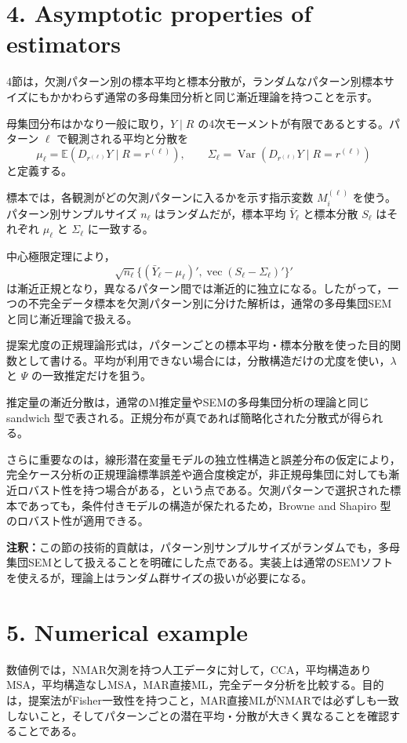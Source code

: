 \documentclass[dvipdfmx,autodetect-engine]{jsarticle}
\newcommand{\E}{\mathbb{E}}
\newcommand{\Var}{\operatorname{Var}}
\newcommand{\note}[1]{\par\smallskip\noindent\textbf{注釈：}#1\par\smallskip}
\begin{document}
\section{4. Asymptotic properties of estimators}

4節は，欠測パターン別の標本平均と標本分散が，ランダムなパターン別標本サイズにもかかわらず通常の多母集団分析と同じ漸近理論を持つことを示す。

母集団分布はかなり一般に取り，$Y\mid R$ の4次モーメントが有限であるとする。パターン $\ell$ で観測される平均と分散を
\[
\mu_\ell=\E(D_{r^{(\ell)}}Y\mid R=r^{(\ell)}),\qquad
\Sigma_\ell=\Var(D_{r^{(\ell)}}Y\mid R=r^{(\ell)})
\]
と定義する。

標本では，各観測がどの欠測パターンに入るかを示す指示変数 $M_i^{(\ell)}$ を使う。パターン別サンプルサイズ $n_\ell$ はランダムだが，標本平均 $\bar Y_\ell$ と標本分散 $S_\ell$ はそれぞれ $\mu_\ell$ と $\Sigma_\ell$ に一致する。

中心極限定理により，
\[
\sqrt{n_\ell}\{(\bar Y_\ell-\mu_\ell)',\operatorname{vec}(S_\ell-\Sigma_\ell)'\}'
\]
は漸近正規となり，異なるパターン間では漸近的に独立になる。したがって，一つの不完全データ標本を欠測パターン別に分けた解析は，通常の多母集団SEMと同じ漸近理論で扱える。

提案尤度の正規理論形式は，パターンごとの標本平均・標本分散を使った目的関数として書ける。平均が利用できない場合には，分散構造だけの尤度を使い，$\lambda$ と $\Psi$ の一致推定だけを狙う。

推定量の漸近分散は，通常のM推定量やSEMの多母集団分析の理論と同じ sandwich 型で表される。正規分布が真であれば簡略化された分散式が得られる。

さらに重要なのは，線形潜在変量モデルの独立性構造と誤差分布の仮定により，完全ケース分析の正規理論標準誤差や適合度検定が，非正規母集団に対しても漸近ロバスト性を持つ場合がある，という点である。欠測パターンで選択された標本であっても，条件付きモデルの構造が保たれるため，Browne and Shapiro 型のロバスト性が適用できる。

\note{この節の技術的貢献は，パターン別サンプルサイズがランダムでも，多母集団SEMとして扱えることを明確にした点である。実装上は通常のSEMソフトを使えるが，理論上はランダム群サイズの扱いが必要になる。}

\section{5. Numerical example}

数値例では，NMAR欠測を持つ人工データに対して，CCA，平均構造ありMSA，平均構造なしMSA，MAR直接ML，完全データ分析を比較する。目的は，提案法がFisher一致性を持つこと，MAR直接MLがNMARでは必ずしも一致しないこと，そしてパターンごとの潜在平均・分散が大きく異なることを確認することである。
\end{document}
